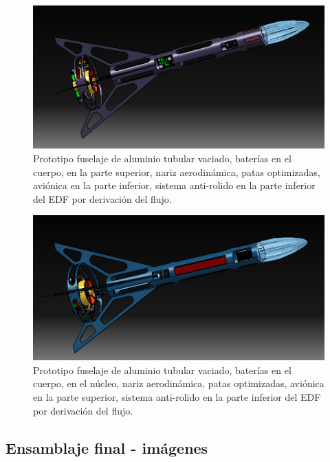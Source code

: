\begin{figure}[htb]
    \centering
    \includegraphics[width=\linewidth]{fig/design/4}
    \caption{Prototipo fuselaje de aluminio tubular vaciado, baterías en el cuerpo, en la parte superior, nariz
    aerodinámica, patas optimizadas, aviónica en la parte inferior, sistema anti-rolido en la parte
    inferior del EDF por derivación del flujo.}
    \label{fig:design/4}
\end{figure}


\begin{figure}[htb]
    \centering
    \includegraphics[width=\linewidth]{fig/design/5}
    \caption{Prototipo fuselaje de aluminio tubular vaciado, baterías en el cuerpo, en el núcleo, nariz aerodinámica, patas optimizadas, aviónica en la parte superior, sistema anti-rolido en la parte
    inferior del EDF por derivación del flujo.}
    \label{fig:design/5}
\end{figure}

\null\newpage
\clearpage

\subsection{Ensamblaje final - imágenes}

